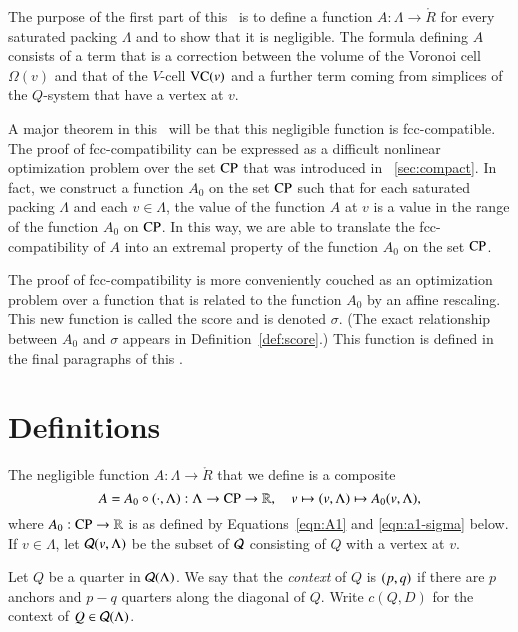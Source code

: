 The purpose of the first part of this \chap\ is to define a
function $A:\Lambda\to\ring{R}$ for every saturated packing
$\Lambda$ and to show that it is negligible.  The formula defining
$A$ consists of a term that is a correction between the volume of
the Voronoi cell $\Omega(v)$ and that of the $V$-cell ${\operatorname{VC}}(v)$
and a further term coming from simplices of the $Q$-system that
have a vertex at $v$.

A major theorem in this \paper\ will be that this negligible
function is fcc-compatible.  The proof of fcc-compatibility can be
expressed as a difficult nonlinear optimization problem over the
set ${\operatorname{CP}}$ that was introduced in \Chap~\ref{sec:compact}.  In
fact, we construct a  function $A_0$ on the set ${\operatorname{CP}}$ such
that for each saturated packing $\Lambda$ and each $v\in\Lambda$,
the value of the function $A$ at $v$ is a value in the range of
the function $A_0$ on ${\operatorname{CP}}$. In this way, we are able to
translate the fcc-compatibility of $A$ into an extremal property
of the function $A_0$ on the set ${\operatorname{CP}}$.

The proof of fcc-compatibility is more conveniently couched as an
optimization problem over a function that is related to the
function $A_0$ by an affine rescaling.   This new function is
called the score and is denoted $\sigma$.  (The exact relationship
between $A_0$ and $\sigma$ appears in Definition~\ref{def:score}.)
This function is defined in the final paragraphs of this \chap.


\section{Definitions}
\label{sec:rules}


The
negligible function $A:\Lambda\to\ring{R}$ that we define is a
composite
  \begin{equation}
  A = A_0\circ (\cdot,\Lambda)
  :\Lambda\to {\operatorname{CP}}\to \mathbb{R},\quad v\mapsto (v,\Lambda)\mapsto
  A_0(v,\Lambda),
  \label{eqn:A}
  \end{equation}
where $A_0:{\operatorname{CP}}\to\mathbb{R}$ is as defined by
Equations~\ref{eqn:A1} and \ref{eqn:a1-sigma} below.  
If $v\in\Lambda$, let
${\mathcal Q}(v,\Lambda)$ be the subset of ${\mathcal Q}$ consisting of
$Q$ with a vertex at $v$.

\begin{definition} \label{def:context}
Let $Q$ be a quarter in ${\mathcal Q}(\Lambda)$.  We say that the {\it
context\/} of $Q$ is $\relax(p,q)$ if there are $p$ anchors and $p-q$
quarters along the diagonal of $Q$. Write $c(Q,D)$ for the context
of $Q\in{\mathcal Q}(\Lambda)$.
\end{definition}


